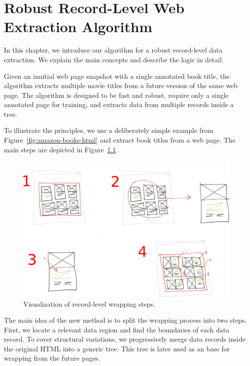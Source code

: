 \chapter{Robust Record-Level Web Extraction Algorithm}

In this chapter, we introduce our algorithm for a robust record-level data extraction. We explain the main concepts and describe the logic in detail.

Given an innitial web page snapshot with a single annotated book title, the algorithm extracts multiple movie titles from a future version of the same web page. The algorithm is designed to be fast and robust, require only a single annotated page for training, and extracts data from multiple records inside a tree.

To illustrate the principles, we use a deliberately simple example from Figure~\ref{fig:amazon-books-html} and extract book titles from a web page. The main steps are depicted in Figure~\ref{fig:algorithm}.

\begin{figure}[h]
	\centering
	\includegraphics[width=1.0\textwidth]{figures/algorithm}
	\caption{Visualization of record-level wrapping steps.}
	\label{fig:algorithm}
\end{figure}

The main idea of the new method is to split the wrapping process into two steps. First, we locate a relevant data region and find the boundaries of each data record. To cover structural variations, we progressively merge data records inside the original HTML into a generic tree. This tree is later used as an base for wrapping from the future pages. 


